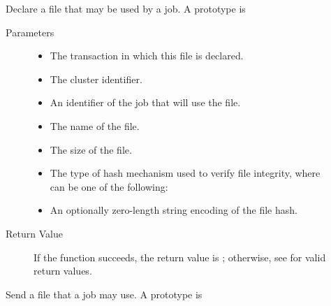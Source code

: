 \begin{description}
\item []
  Declare a file that may be used by a job.
  A prototype is 

  
  \begin{description}
    \item[ Parameters]
    \begin{itemize}
      \item {} 
      The transaction in which this file is declared.
      \item {} The cluster identifier.
      \item {}
      An identifier of the job that will use the file.
      \item {} The name of the file.
      \item {} The size of the file.
      \item {}
      The type of hash mechanism used to verify file integrity, where 
       can be one of the following:

      
      \item {}
      An optionally zero-length string encoding of the file hash.
    \end{itemize}
    \item[ Return Value]
      If the function succeeds, the return value is ; 
      otherwise, see  for valid return values. 
  \end{description}   

\item []
  Send a file that a job may use.
  A prototype is 



\end{description}
